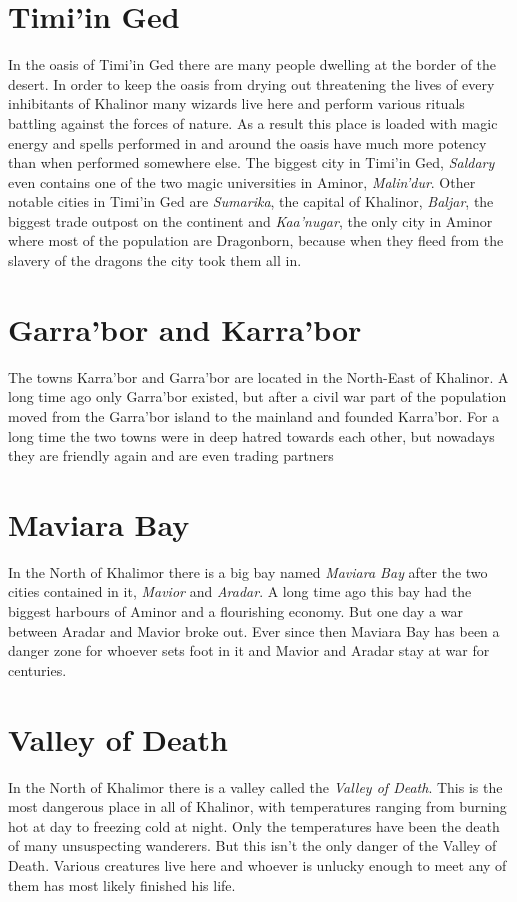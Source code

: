 \documentclass[oneside]{book}
\begin{document}
	\section{Timi'in Ged}
	In the oasis of Timi'in Ged there are many people dwelling at the border of the desert.
	In order to keep the oasis from drying out threatening the lives of every inhibitants of Khalinor many wizards live here and perform various rituals battling against the forces of nature.
	As a result this place is loaded with magic energy and spells performed in and around the oasis have much more potency than when performed somewhere else. 
	The biggest city in Timi'in Ged, \textit{Saldary} even contains one of the two magic universities in Aminor, \textit{Malin'dur}.
	Other notable cities in Timi'in Ged are \textit{Sumarika}, the capital of Khalinor, \textit{Baljar}, the biggest trade outpost on the continent and 
	\textit{Kaa'nugar}, the only city in Aminor where most of the population are Dragonborn, because when they fleed from the slavery of the dragons the city took them all in.
	
	\section{Garra'bor and Karra'bor}
	The towns Karra'bor and Garra'bor are located in the North-East of Khalinor.
	A long time ago only Garra'bor existed, but after a civil war part of the population moved from the Garra'bor island to the mainland  and founded Karra'bor. 
	For a long time the two towns were in deep hatred towards each other, but nowadays they are friendly again and are even trading partners
	
	\section{Maviara Bay}
	In the North of Khalimor there is a big bay named \textit{Maviara Bay} after the two cities contained in it, \textit{Mavior} and \textit{Aradar}. 
	A long time ago this bay had the biggest harbours of Aminor and a flourishing economy. But one day a war between Aradar and Mavior broke out. 
	Ever since then Maviara Bay has been a danger zone for whoever sets foot in it and Mavior and Aradar stay at war for centuries.
	
	\section{Valley of Death}
	In the North of Khalimor there is a valley called the \textit{Valley of Death}. 
	This is the most dangerous place in all of Khalinor, with temperatures ranging from burning hot at day to freezing cold at night. 
	Only the temperatures have been the death of many unsuspecting wanderers. But this isn't the only danger of the Valley of Death.
	Various creatures live here and whoever is unlucky enough to meet any of them has most likely finished his life.
	
\end{document}
